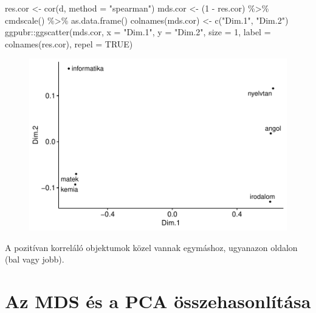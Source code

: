 \documentclass[
  letterpaper,
]{krantz}
\makeatletter
\newenvironment{Shaded}{\begin{snugshade}}{\end{snugshade}}
\newcommand{\AttributeTok}[1]{\textcolor[rgb]{0.40,0.45,0.13}{#1}}
\newcommand{\ConstantTok}[1]{\textcolor[rgb]{0.56,0.35,0.01}{#1}}
\newcommand{\DecValTok}[1]{\textcolor[rgb]{0.68,0.00,0.00}{#1}}
\newcommand{\FunctionTok}[1]{\textcolor[rgb]{0.28,0.35,0.67}{#1}}
\newcommand{\NormalTok}[1]{\textcolor[rgb]{0.00,0.23,0.31}{#1}}
\newcommand{\OtherTok}[1]{\textcolor[rgb]{0.00,0.23,0.31}{#1}}
\newcommand{\SpecialCharTok}[1]{\textcolor[rgb]{0.37,0.37,0.37}{#1}}
\newcommand{\StringTok}[1]{\textcolor[rgb]{0.13,0.47,0.30}{#1}}
\newenvironment{kframe}{%
\medskip{}
\setlength{\fboxsep}{.8em}
 \def\at@end@of@kframe{}%
 \ifinner\ifhmode%
  \def\at@end@of@kframe{\end{minipage}}%
  \begin{minipage}{\columnwidth}%
 \fi\fi%
 \def\FrameCommand##1{\hskip\@totalleftmargin \hskip-\fboxsep
 \colorbox{shadecolor}{##1}\hskip-\fboxsep
     \hskip-\linewidth \hskip-\@totalleftmargin \hskip\columnwidth}%
 \MakeFramed {\advance\hsize-\width
   \@totalleftmargin\z@ \linewidth\hsize
   \@setminipage}}%
 {\par\unskip\endMakeFramed%
 \at@end@of@kframe}
\renewenvironment{Shaded}{\begin{kframe}}{\end{kframe}}
\makeatother
\begin{document}
\begin{Shaded}
\begin{Highlighting}[]
\NormalTok{res.cor }\OtherTok{\textless{}{-}} \FunctionTok{cor}\NormalTok{(d, }\AttributeTok{method =} \StringTok{"spearman"}\NormalTok{)}
\NormalTok{mds.cor }\OtherTok{\textless{}{-}}\NormalTok{ (}\DecValTok{1} \SpecialCharTok{{-}}\NormalTok{ res.cor) }\SpecialCharTok{\%\textgreater{}\%}
    \FunctionTok{cmdscale}\NormalTok{() }\SpecialCharTok{\%\textgreater{}\%}
    \FunctionTok{as.data.frame}\NormalTok{()}
\FunctionTok{colnames}\NormalTok{(mds.cor) }\OtherTok{\textless{}{-}} \FunctionTok{c}\NormalTok{(}\StringTok{"Dim.1"}\NormalTok{, }\StringTok{"Dim.2"}\NormalTok{)}
\NormalTok{ggpubr}\SpecialCharTok{::}\FunctionTok{ggscatter}\NormalTok{(mds.cor, }\AttributeTok{x =} \StringTok{"Dim.1"}\NormalTok{, }\AttributeTok{y =} \StringTok{"Dim.2"}\NormalTok{, }\AttributeTok{size =} \DecValTok{1}\NormalTok{,}
    \AttributeTok{label =} \FunctionTok{colnames}\NormalTok{(res.cor), }\AttributeTok{repel =} \ConstantTok{TRUE}\NormalTok{)}
\end{Highlighting}
\end{Shaded}

\begin{figure}[H]

{\centering \includegraphics{./sec_tobbdimenzios_skalazas_files/figure-pdf/unnamed-chunk-6-1.pdf}

}

\end{figure}

A pozitívan korreláló objektumok közel vannak egymáshoz, ugyanazon
oldalon (bal vagy jobb).

\hypertarget{az-mds-uxe9s-a-pca-uxf6sszehasonluxedtuxe1sa}{%
\section{Az MDS és a PCA
összehasonlítása}\label{az-mds-uxe9s-a-pca-uxf6sszehasonluxedtuxe1sa}}
\end{document}
